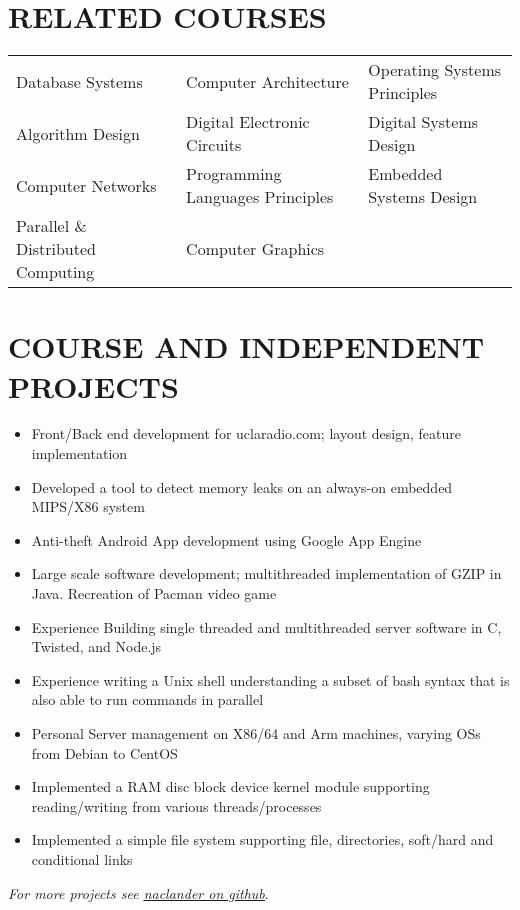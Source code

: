 \documentclass[line,letterpaper]{resume}
\begin{document}
\begin{resume}
	\section{\uppercase{Related Courses}}
	\begin{tabular}{l l l}
	Database Systems & Computer Architecture & Operating Systems  Principles \\
	Algorithm Design & Digital Electronic Circuits & Digital Systems Design \\
	Computer Networks & Programming Languages Principles& Embedded Systems Design\\
    Parallel \& Distributed Computing & Computer Graphics\\
	\end{tabular}

\section{\uppercase{Course and Independent Projects}}
	\begin{itemize}
	\item Front/Back end development for uclaradio.com; layout design, feature implementation
	\item Developed a tool to detect memory leaks on an always-on embedded MIPS/X86 system
	\item Anti-theft Android App development using Google App Engine
	\item Large scale software development; multithreaded implementation of GZIP
	in Java. Recreation of Pacman video game
	\item Experience Building single threaded and multithreaded server software
	in C, Twisted, and Node.js
	\item Experience writing a Unix shell understanding a subset of bash syntax
	that is also able to run commands in parallel
	\item Personal Server management on X86/64 and Arm machines, varying OSs
	from Debian to CentOS
	\item Implemented a RAM disc block device kernel module supporting
	reading/writing from various threads/processes
	\item Implemented a simple file system supporting file, directories,
	soft/hard and conditional links
	\end{itemize}
    \vspace{-6pt}

    \hfill \emph{For more projects see
    \underline{\href{https://github.com/naclander}{naclander on github}}}.


\end{resume}
\end{document}
